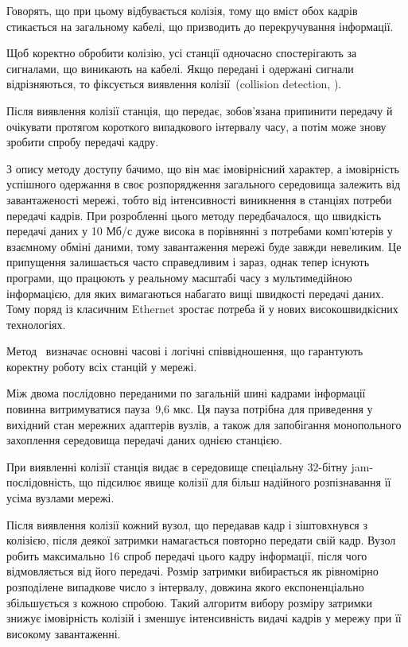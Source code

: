 \documentclass[
  ukrainian,
  simple,
  floatsection,
]{eskdnaukvd}
\begin{document}
      Говорять, що при цьому відбувається колізія, тому що вміст обох кадрів стикається на загальному кабелі, що призводить до перекручування інформації.

      Щоб коректно обробити колізію, усі станції одночасно спостерігають за сигналами, що виникають на кабелі. Якщо передані і одержані сигнали відрізняються, то фіксується виявлення колізії~(\textenglish{collision detection, }).

      Після виявлення колізії станція, що передає, зобов'язана припинити передачу й очікувати протягом короткого випадкового інтервалу часу, а потім може знову зробити спробу передачі кадру.

      З опису методу доступу бачимо, що він має імовірнісний характер, а імовірність успішного одержання в своє розпорядження загального середовища залежить від завантаженості мережі, тобто від інтенсивності виникнення в станціях потреби передачі кадрів. При розробленні цього методу передбачалося, що швидкість передачі даних у 10 Мб/с дуже висока в порівнянні з потребами комп'ютерів у взаємному обміні даними, тому завантаження мережі буде завжди невеликим. Це припущення залишається часто справедливим і зараз, однак тепер існують програми, що працюють у реальному масштабі часу з мультимедійною інформацією, для яких вимагаються набагато вищі швидкості передачі даних. Тому поряд із класичним \textenglish{Ethernet} зростає потреба й у нових високошвидкісних технологіях.

      Метод~\textenglish{} визначає основні часові і логічні співвідношення, що гарантують коректну роботу всіх станцій у мережі.

      Між двома послідовно переданими по загальній шині кадрами інформації повинна витримуватися пауза~9{,}6 мкс. Ця пауза потрібна для приведення у вихідний стан мережних адаптерів вузлів, а також для запобігання монопольного захоплення середовища передачі даних однією станцією.

      При виявленні колізії станція видає в середовище спеціальну 32-бітну \textenglish{jam}-послідовність, що підсилює явище колізії для більш надійного розпізнавання її усіма вузлами мережі.

      Після виявлення колізії кожний вузол, що передавав кадр і зіштовхнувся з колізією, після деякої затримки намагається повторно передати свій кадр. Вузол робить максимально 16 спроб передачі цього кадру інформації, після чого відмовляється від його передачі. Розмір затримки вибирається як рівномірно розподілене випадкове число з інтервалу, довжина якого експоненціально збільшується з кожною спробою. Такий алгоритм вибору розміру затримки знижує імовірність колізій і зменшує інтенсивність видачі кадрів у мережу при її високому завантаженні.
\end{document}
